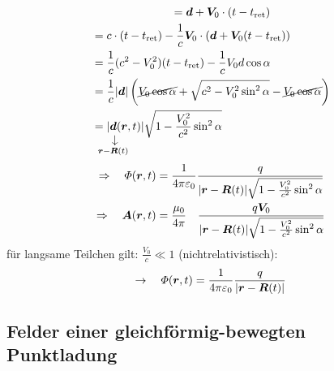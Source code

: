 \begin{enumerate}[i)]
\begin{align*}
	& \quad \qquad \qquad \qquad = \vec{d} + \vec{V}_0 \cdot (t - t_{\tx{ret}})\\
	&= c \cdot (t - t_{\tx{ret}}) - \frac{1}{c} \vec{V}_0 \cdot (\vec{d} + \vec{V}_0 (t - t_{\tx{ret}}))\\
	&= \frac{1}{c} (c^2 - V_0^2) (t - t_{\tx{ret}}) - \frac{1}{c} V_0 d \cos \alpha\\
	&= \frac{1}{c} |\vec{d}| \left(\cancel{ V_0 \cos \alpha} + \sqrt{c^2 - V_0^2 \sin^2 \alpha} - \cancel{ V_0 \cos \alpha}\right)\\
	&= |\custo{\rightarrow}{\vec{d}}{\mathclap{\vec{r} - \vec{R}(t)}}(\vec{r},t)| \sqrt{1 - \frac{V_0^2}{c^2} \sin^2 \alpha}
	\end{align*}
	\begin{align*}
	\Rightarrow \quad \Phi(\vec{r},t) &= \kq \frac{q}{|\vec{r} - \vec{R}(t)| \sqrt{1 - \frac{V_0^2}{c^2} \sin^2 \alpha}}\\
	\Rightarrow \quad \vec{A}(\vec{r},t) &= \frac{\mu_0}{4 \pi} \ \ \ \frac{q \vec{V}_0}{|\vec{r} - \vec{R}(t)| \sqrt{1 - \frac{V_0^2}{c^2} \sin^2 \alpha}}
	\end{align*}
	für langsame Teilchen gilt: $ \frac{V_0}{c} \ll 1 $ (nichtrelativistisch):
	\begin{equation*}
	\rightarrow \quad \varPhi(\bm{r},t) = \frac{1}{4\pi\varepsilon_0} \frac{q}{|\bm{r} - \bm{R}(t)|}
	\end{equation*}
\end{enumerate}

\subsection{Felder einer gleichförmig-bewegten Punktladung}

